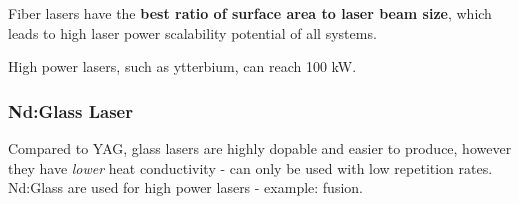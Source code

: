 Fiber lasers have the \textbf{best ratio of surface area to laser beam size}, which leads to high laser power scalability potential 
of all systems. 

High power lasers, such as ytterbium, can reach 100 kW.

\subsubsection{Nd:Glass Laser}
Compared to YAG, glass lasers are highly dopable and easier to produce, however they have \textit{lower} heat conductivity - can only be used 
with low repetition rates. Nd:Glass are used for high power lasers - example: fusion.  
